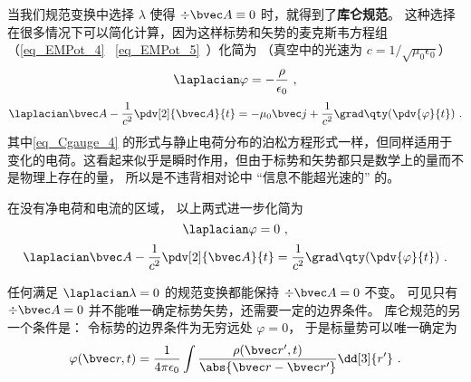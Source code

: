 
\begin{issues}
\issueDraft
\end{issues}


当我们规范变换中选择 $\lambda$ 使得 $\div \bvec A \equiv 0$ 时，就得到了\textbf{库仑规范}。 这种选择在很多情况下可以简化计算，因为这样标势和矢势的麦克斯韦方程组（\autoref{eq_EMPot_4}~ \autoref{eq_EMPot_5}~）化简为 （真空中的光速为 $c = 1/\sqrt{\mu_0\epsilon_0}$）%
\begin{equation}\label{eq_Cgauge_4}
\laplacian \varphi = -\frac{\rho}{\epsilon_0}~,
\end{equation}
\begin{equation}\label{eq_Cgauge_3}
\laplacian \bvec A - \frac{1}{c^2} \pdv[2]{\bvec A}{t} = -\mu_0\bvec j + \frac{1}{c^2} \grad\qty(\pdv{\varphi}{t})~.
\end{equation}
其中\autoref{eq_Cgauge_4} 的形式与静止电荷分布的泊松方程形式一样，但同样适用于变化的电荷。这看起来似乎是瞬时作用，但由于标势和矢势都只是数学上的量而不是物理上存在的量， 所以是不违背相对论中 “信息不能超光速的” 的。

在没有净电荷和电流的区域， 以上两式进一步化简为
\begin{equation}
\laplacian \varphi = 0~,
\end{equation}
\begin{equation}
\laplacian \bvec A - \frac{1}{c^2}\pdv[2]{\bvec A}{t} = \frac{1}{c^2} \grad\qty(\pdv{\varphi}{t})~.
\end{equation}

任何满足 $\laplacian \lambda = 0$ 的规范变换都能保持 $\div \bvec A = 0$ 不变。 可见只有 $\div \bvec A = 0$ 并不能唯一确定标势矢势，还需要一定的边界条件。 库仑规范的另一个条件是： 令标势的边界条件为无穷远处 $\varphi = 0$， 于是标量势可以唯一确定为
\begin{equation}\label{eq_Cgauge_1}
\varphi(\bvec r, t) = \frac{1}{4\pi\epsilon_0} \int \frac{\rho(\bvec r', t)}{\abs{\bvec r - \bvec r'}} \dd[3]{r'}~.
\end{equation}

